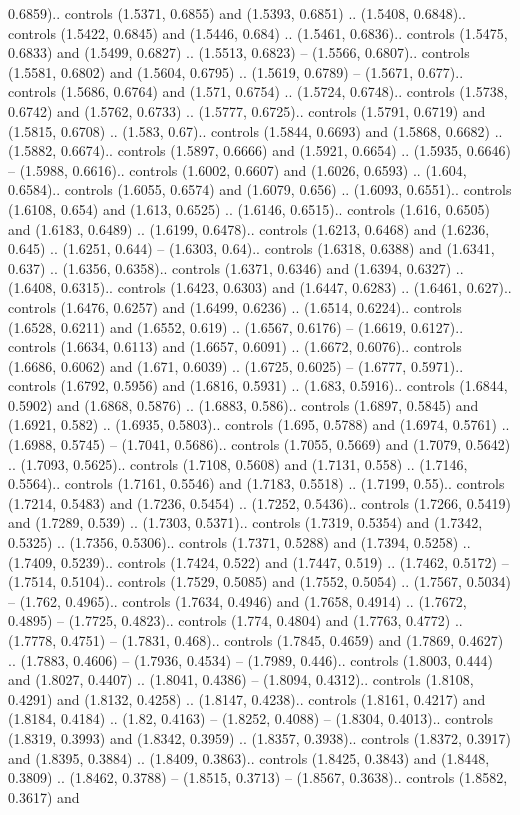 0.6859).. controls (1.5371, 0.6855) and (1.5393, 0.6851) .. (1.5408, 0.6848).. controls (1.5422, 0.6845) and (1.5446, 0.684) .. (1.5461, 0.6836).. controls (1.5475, 0.6833) and (1.5499, 0.6827) .. (1.5513, 0.6823) -- (1.5566, 0.6807).. controls (1.5581, 0.6802) and (1.5604, 0.6795) .. (1.5619, 0.6789) -- (1.5671, 0.677).. controls (1.5686, 0.6764) and (1.571, 0.6754) .. (1.5724, 0.6748).. controls (1.5738, 0.6742) and (1.5762, 0.6733) .. (1.5777, 0.6725).. controls (1.5791, 0.6719) and (1.5815, 0.6708) .. (1.583, 0.67).. controls (1.5844, 0.6693) and (1.5868, 0.6682) .. (1.5882, 0.6674).. controls (1.5897, 0.6666) and (1.5921, 0.6654) .. (1.5935, 0.6646) -- (1.5988, 0.6616).. controls (1.6002, 0.6607) and (1.6026, 0.6593) .. (1.604, 0.6584).. controls (1.6055, 0.6574) and (1.6079, 0.656) .. (1.6093, 0.6551).. controls (1.6108, 0.654) and (1.613, 0.6525) .. (1.6146, 0.6515).. controls (1.616, 0.6505) and (1.6183, 0.6489) .. (1.6199, 0.6478).. controls (1.6213, 0.6468) and (1.6236, 0.645) .. (1.6251, 0.644) -- (1.6303, 0.64).. controls (1.6318, 0.6388) and (1.6341, 0.637) .. (1.6356, 0.6358).. controls (1.6371, 0.6346) and (1.6394, 0.6327) .. (1.6408, 0.6315).. controls (1.6423, 0.6303) and (1.6447, 0.6283) .. (1.6461, 0.627).. controls (1.6476, 0.6257) and (1.6499, 0.6236) .. (1.6514, 0.6224).. controls (1.6528, 0.6211) and (1.6552, 0.619) .. (1.6567, 0.6176) -- (1.6619, 0.6127).. controls (1.6634, 0.6113) and (1.6657, 0.6091) .. (1.6672, 0.6076).. controls (1.6686, 0.6062) and (1.671, 0.6039) .. (1.6725, 0.6025) -- (1.6777, 0.5971).. controls (1.6792, 0.5956) and (1.6816, 0.5931) .. (1.683, 0.5916).. controls (1.6844, 0.5902) and (1.6868, 0.5876) .. (1.6883, 0.586).. controls (1.6897, 0.5845) and (1.6921, 0.582) .. (1.6935, 0.5803).. controls (1.695, 0.5788) and (1.6974, 0.5761) .. (1.6988, 0.5745) -- (1.7041, 0.5686).. controls (1.7055, 0.5669) and (1.7079, 0.5642) .. (1.7093, 0.5625).. controls (1.7108, 0.5608) and (1.7131, 0.558) .. (1.7146, 0.5564).. controls (1.7161, 0.5546) and (1.7183, 0.5518) .. (1.7199, 0.55).. controls (1.7214, 0.5483) and (1.7236, 0.5454) .. (1.7252, 0.5436).. controls (1.7266, 0.5419) and (1.7289, 0.539) .. (1.7303, 0.5371).. controls (1.7319, 0.5354) and (1.7342, 0.5325) .. (1.7356, 0.5306).. controls (1.7371, 0.5288) and (1.7394, 0.5258) .. (1.7409, 0.5239).. controls (1.7424, 0.522) and (1.7447, 0.519) .. (1.7462, 0.5172) -- (1.7514, 0.5104).. controls (1.7529, 0.5085) and (1.7552, 0.5054) .. (1.7567, 0.5034) -- (1.762, 0.4965).. controls (1.7634, 0.4946) and (1.7658, 0.4914) .. (1.7672, 0.4895) -- (1.7725, 0.4823).. controls (1.774, 0.4804) and (1.7763, 0.4772) .. (1.7778, 0.4751) -- (1.7831, 0.468).. controls (1.7845, 0.4659) and (1.7869, 0.4627) .. (1.7883, 0.4606) -- (1.7936, 0.4534) -- (1.7989, 0.446).. controls (1.8003, 0.444) and (1.8027, 0.4407) .. (1.8041, 0.4386) -- (1.8094, 0.4312).. controls (1.8108, 0.4291) and (1.8132, 0.4258) .. (1.8147, 0.4238).. controls (1.8161, 0.4217) and (1.8184, 0.4184) .. (1.82, 0.4163) -- (1.8252, 0.4088) -- (1.8304, 0.4013).. controls (1.8319, 0.3993) and (1.8342, 0.3959) .. (1.8357, 0.3938).. controls (1.8372, 0.3917) and (1.8395, 0.3884) .. (1.8409, 0.3863).. controls (1.8425, 0.3843) and (1.8448, 0.3809) .. (1.8462, 0.3788) -- (1.8515, 0.3713) -- (1.8567, 0.3638).. controls (1.8582, 0.3617) and 